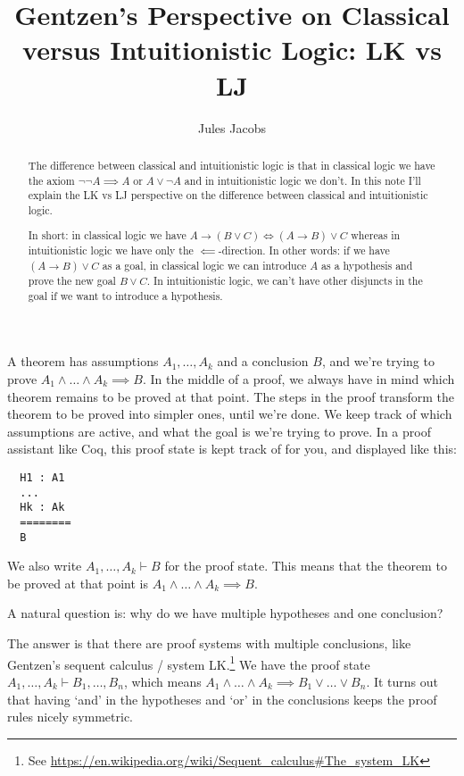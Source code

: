 \documentclass[a4paper, 11pt]{article}
\title{Gentzen's Perspective on Classical versus Intuitionistic Logic: LK vs LJ}
\author{Jules Jacobs}
\theoremstyle{definition}
\begin{document}
\maketitle

\begin{abstract}
  The difference between classical and intuitionistic logic is that in classical logic we have the axiom $\neg \neg A \implies A$ or $A \vee \neg A$ and in intuitionistic logic we don't. In this note I'll explain the LK vs LJ perspective on the difference between classical and intuitionistic logic.

  In short: in classical logic we have $A \to (B \vee C) \iff (A \to B) \vee C$ whereas in intuitionistic logic we have only the $\impliedby$-direction. In other words: if we have $(A \to B) \vee C$ as a goal, in classical logic we can introduce $A$ as a hypothesis and prove the new goal $B \vee C$. In intuitionistic logic, we can't have other disjuncts in the goal if we want to introduce a hypothesis.
\end{abstract}

A theorem has assumptions $A_1, \dots, A_k$ and a conclusion $B$, and we're trying to prove $A_1 \wedge \dots \wedge A_k \implies B$. In the middle of a proof, we always have in mind which theorem remains to be proved at that point. The steps in the proof transform the theorem to be proved into simpler ones, until we're done. We keep track of which assumptions are active, and what the goal is we're trying to prove. In a proof assistant like Coq, this proof state is kept track of for you, and displayed like this:

\begin{lstlisting}
  H1 : A1
  ...
  Hk : Ak
  ========
  B
\end{lstlisting}

We also write $A_1, \dots, A_k \vdash B$ for the proof state. This means that the theorem to be proved at that point is $A_1 \wedge \dots \wedge A_k \implies B$.

A natural question is: why do we have multiple hypotheses and one conclusion?

The answer is that there are proof systems with multiple conclusions, like Gentzen's sequent calculus / system LK.\footnote{See \url{https://en.wikipedia.org/wiki/Sequent_calculus\#The_system_LK}} We have the proof state $A_1, \dots, A_k \vdash B_1, \dots, B_n$, which means $A_1 \wedge \dots \wedge A_k \implies B_1 \vee \dots \vee B_n$. It turns out that having `and' in the hypotheses and `or' in the conclusions keeps the proof rules nicely symmetric.
\end{document}
